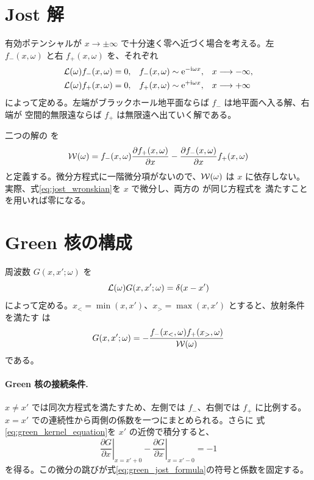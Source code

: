 \section{Jost 解}

有効ポテンシャルが $x\to\pm\infty$ で十分速く零へ近づく場合を考える。左 
$f_-(x,\omega)$ と右  $f_+(x,\omega)$ を、それぞれ
\begin{align}
\mathcal{L}(\omega)f_-(x,\omega)&=0,
&
f_-(x,\omega)&\sim\mathrm{e}^{-\mathrm{i}\omega x},
&&x\longrightarrow-\infty,
\label{eq:left_jost}
\\
\mathcal{L}(\omega)f_+(x,\omega)&=0,
&
f_+(x,\omega)&\sim\mathrm{e}^{+\mathrm{i}\omega x},
&&x\longrightarrow+\infty
\label{eq:right_jost}
\end{align}
によって定める。左端がブラックホール地平面ならば $f_-$ は地平面へ入る解、右端が
空間的無限遠ならば $f_+$ は無限遠へ出ていく解である。

二つの解の  を
\begin{equation}
\mathcal{W}(\omega)
=
f_-(x,\omega)
\frac{\partial f_+(x,\omega)}{\partial x}
-
\frac{\partial f_-(x,\omega)}{\partial x}
f_+(x,\omega)
\label{eq:jost_wronskian}
\end{equation}
と定義する。微分方程式に一階微分項がないので、$\mathcal{W}(\omega)$ は $x$ に依存しない。
実際、式\eqref{eq:jost_wronskian}を $x$ で微分し、両方の が同じ方程式を
満たすことを用いれば零になる。

\section{Green 核の構成}

周波数  $G(x,x';\omega)$ を
\begin{equation}
\mathcal{L}(\omega)G(x,x';\omega)
=
\delta(x-x')
\label{eq:green_kernel_equation}
\end{equation}
によって定める。$x_< =\min(x,x')$、$x_>=\max(x,x')$ とすると、放射条件を満たす
は
\begin{equation}
G(x,x';\omega)
=
-\frac{
f_-(x_<,\omega)f_+(x_>,\omega)
}{
\mathcal{W}(\omega)
}
\label{eq:green_jost_formula}
\end{equation}
である。

\paragraph{Green 核の接続条件.}
$x\ne x'$ では同次方程式を満たすため、左側では $f_-$、右側では $f_+$ に比例する。
$x=x'$ での連続性から両側の係数を一つにまとめられる。さらに
式\eqref{eq:green_kernel_equation}を $x'$ の近傍で積分すると、
\begin{equation}
\left.
\frac{\partial G}{\partial x}
\right|_{x=x'+0}
-
\left.
\frac{\partial G}{\partial x}
\right|_{x=x'-0}
=
-1
\end{equation}
を得る。この微分の跳びが式\eqref{eq:green_jost_formula}の符号と係数を固定する。

